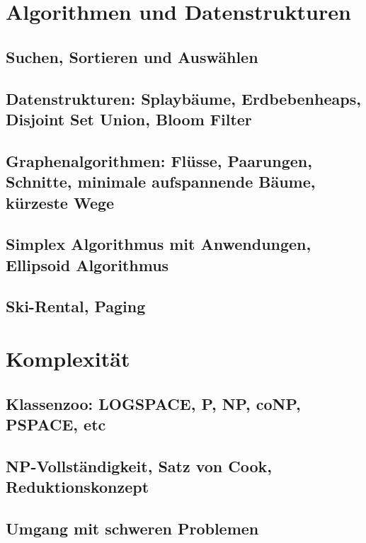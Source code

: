 \documentclass[a4paper,10pt]{scrbook}
\begin{document}
\chapter{Algorithmen und Datenstrukturen}
\section{Suchen, Sortieren und Auswählen}
\section{Datenstrukturen: Splaybäume, Erdbebenheaps, Disjoint Set Union, Bloom Filter}
\section{Graphenalgorithmen: Flüsse, Paarungen, Schnitte, minimale aufspannende Bäume, kürzeste Wege}
\section{Simplex Algorithmus mit Anwendungen, Ellipsoid Algorithmus}
\section{Ski-Rental, Paging}
\chapter{Komplexität}
\section{Klassenzoo: LOGSPACE, P, NP, coNP, PSPACE, etc}
\section{NP-Vollständigkeit, Satz von Cook, Reduktionskonzept}
\section{Umgang mit schweren Problemen}
\end{document}
